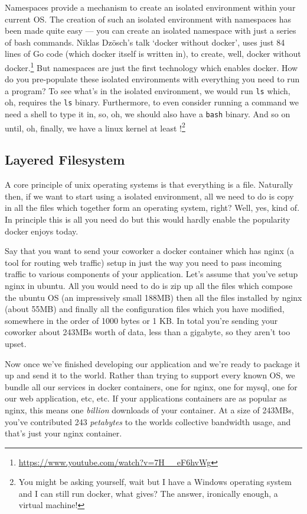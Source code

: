 Namespaces provide a mechanism to create an isolated environment within your current OS.
The creation of such an isolated environment with namespaces has been made quite easy --- you can create an isolated namespace with just a series of bash commands.
Niklas Dz{\"o}sch's talk `docker without docker', uses just 84 lines of Go code (which docker itself is written in),
to create, well, docker without docker.\footnote{\url{https://www.youtube.com/watch?v=7H__eF6hvWg}}
But namespaces are just the first technology which enables docker.
How do you pre-populate these isolated environments with everything you need to run a program?
To see what's in the isolated environment, we would run \texttt{ls} which, oh, requires the \texttt{ls} binary.
Furthermore, to even consider running a command we need a shell to type it in, so, oh, we should also have a \texttt{bash} binary.
And so on until, oh, finally, we have a linux kernel at least%
!\footnote{You might be asking yourself, wait but I have a Windows operating system and I can still run docker, what gives? The answer, ironically enough, a virtual machine!}

\subsection{Layered Filesystem}
A core principle of unix operating systems is that everything is a file.
Naturally then, if we want to start using a isolated environment,
all we need to do is copy in all the files which together form an operating system, right?
Well, yes, kind of.
In principle this is all you need do but this would hardly enable the popularity docker enjoys today.

Say that you want to send your coworker a docker container which has nginx (a tool for routing web traffic)
setup in just the way you need to pass incoming traffic to various components of your application.
Let's assume that you've setup nginx in ubuntu.
All you would need to do is zip up all the files which compose the ubuntu OS (an impressively small 188MB)
then all the files installed by nginx (about 55MB) and finally all the configuration files which you have modified,
somewhere in the order of 1000 bytes or 1 KB.
In total you're sending your coworker about 243MBs worth of data, less than a gigabyte, so they aren't too upset.

Now once we've finished developing our application and we're ready to package it up and send it to the world.
Rather than trying to support every known OS, we bundle all our services in docker containers,
one for nginx, one for mysql, one for our web application, etc, etc.
If your applications containers are as popular as nginx, this means one \textsl{billion} downloads of your container.
At a size of 243MBs, you've contributed 243 \textsl{petabytes} to the worlds collective bandwidth usage, and that's just your nginx container.

